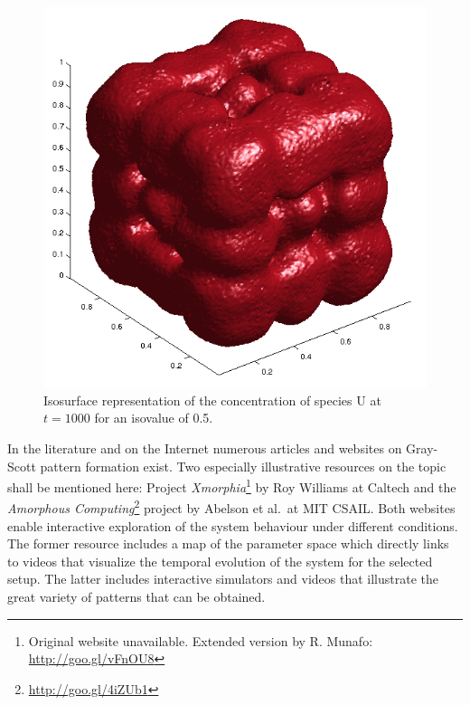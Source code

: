 \begin{figure}
\centering
\includegraphics[height=0.4\paperheight]{images/3d.png}
\caption{Isosurface representation of the concentration of species U at $t=1000$ for an isovalue of 0.5.}
\label{fig:3d}
\end{figure}

In the literature and on the Internet numerous articles and websites on Gray-Scott pattern formation exist. Two especially illustrative resources on the topic shall be mentioned here: Project \textit{Xmorphia}\footnote{Original website unavailable. Extended version by R. Munafo: \url{http://goo.gl/vFnOU8}} by Roy Williams at Caltech and the \textit{Amorphous Computing}\footnote{\url{http://goo.gl/4iZUb1}} project by Abelson et al.\ at MIT CSAIL. Both websites enable interactive exploration of the system behaviour under different conditions. The former resource includes a map of the parameter space which directly links to videos that visualize the temporal evolution of the system for the selected setup. The latter includes interactive simulators and videos that illustrate the great variety of patterns that can be obtained. 


